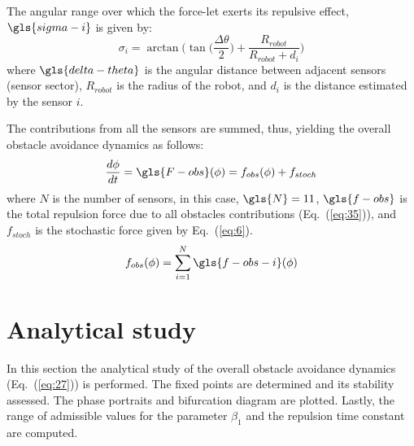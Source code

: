 The angular range over which the force-let exerts its repulsive effect, 
$\gls{sigma-i}$ is given by:
\begin{equation}
  \label{eq:26}
  \sigma_{i} = \arctan \Bigg( \tan \Big(\frac{\Delta \theta}{2} \Big ) + 
  \frac{R_{robot}}{R_{robot} + d_i}\Bigg)
\end{equation}
where $\gls{delta-theta}$ is the angular distance between adjacent sensors (sensor
sector), $R_{robot}$ is the radius of the robot, and $d_i$ is the distance
estimated by the sensor $i$.

The contributions from all the sensors are summed, thus, yielding the overall
obstacle avoidance dynamics as follows:
\begin{equation}
  \label{eq:27}
 \frac{d \phi}{dt} = \gls{F-obs}(\phi) = f_{obs}(\phi) + f_{stoch}
\end{equation}
where $N$ is the number of sensors, in this case, $\gls{N} = 11$, $\gls{f-obs}$ is the
total repulsion force due to all obstacles contributions (Eq.~(\ref{eq:35})),
and $f_{stoch}$ is
the stochastic force given by Eq.~(\ref{eq:6}).
\begin{equation}
  \label{eq:35}
  f_{obs} (\phi) = \sum_{i = 1}^N \gls{f-obs-i}(\phi) 
\end{equation}

\section{Analytical study}%
\label{sec:analytical-study-obs}
In this section the analytical study of the overall obstacle avoidance dynamics
(Eq.~(\ref{eq:27})) is performed. The fixed points are determined and its
stability assessed. The phase portraits and bifurcation diagram are
plotted. Lastly, the range of admissible values for the parameter $\beta_1$ and
the repulsion time constant are computed.

